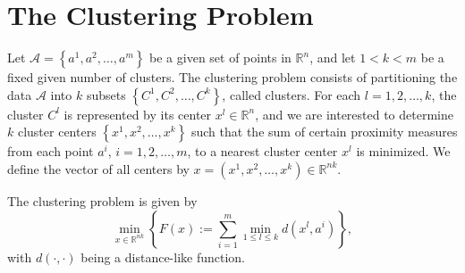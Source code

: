 \documentclass[11pt]{article}
\numberwithin{equation}{section}
\begin{document}
%
%
%
%
%
%
%
%
%
%
%
%
%
%
%
%
%
%
%
%
%

\newpage

\section{The Clustering Problem}

Let $\mathcal{A}= \left\lbrace a^1, a^2, \ldots ,a^m \right\rbrace$ be a given set of points in $\mathbb{R}^n$, and let $1 < k < m$ be a fixed given number of clusters. The clustering problem consists of partitioning the data $\mathcal{A}$ into $k$ subsets $\left\lbrace C^1, C^2, \ldots ,C^k \right\rbrace$, called clusters. For each $l=1, 2, \ldots ,k$, the cluster $C^l$ is represented by its center $x^l \in \mathbb{R}^n$, and we are interested to determine $k$ cluster centers $\left\lbrace x^1, x^2, \ldots ,x^k \right\rbrace$ such that the sum of certain proximity measures from each point $a^i$, $i=1, 2, \ldots ,m$, to a nearest cluster center $x^l$ is minimized. We define the vector of all centers by  $x = (x^1, x^2, \ldots , x^k) \in \mathbb{R}^{nk}$.

The clustering problem is given by
\begin{equation}
	\min\limits_{x \in \mathbb{R}^{nk}} \left\lbrace F(x) := \sum\limits_{i=1}^{m} \min\limits_{1 \le l \le k} d(x^l,a^i) \right\rbrace , \label{StateEq1}
\end{equation}
\noindent with $\textit{d}(\cdot ,\cdot)$ being a distance-like function.
\end{document}
